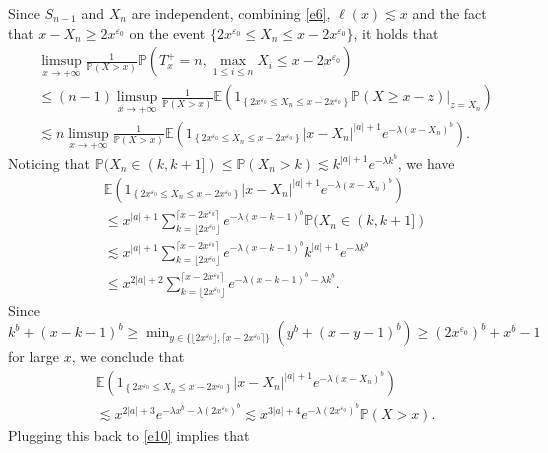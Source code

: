 \documentclass[11pt]{article}
\numberwithin{equation}{section}
\begin{document}
Since $S_{n-1}$ and $X_n$ are independent, combining \eqref{e6}, $\ell (x)\lesssim x$ and the fact that $x-X_n \geq 2x^{\varepsilon_0}$ on the event $\{2x^{\varepsilon_0}\leq X_n \leq x-2x^{\varepsilon_0}\}$,  it holds that 
\begin{align}\label{e10}
	& \limsup_{x\to+\infty} \frac{1}{\mathbb{P}(X>x)}\mathbb{P}\left(T_x^+=n, \max_{1\leq i\leq n} X_i \leq x-2x^{\varepsilon_0}\right)\nonumber\\
	& \leq (n-1) \limsup_{x\to+\infty} \frac{1}{\mathbb{P}(X>x)}\mathbb{E}\left(1_{\left\{2x^{\varepsilon_0}\leq X_n \leq x-2x^{\varepsilon_0} \right\}} \mathbb{P}(X \geq x-z)\big|_{z=X_n} \right) \nonumber\\
	&\lesssim  n \limsup_{x\to+\infty} \frac{1}{\mathbb{P}(X>x)} \mathbb{E}\left(1_{\left\{2x^{\varepsilon_0}\leq X_n \leq x-2x^{\varepsilon_0} \right\}}  |x-X_n|^{|a|+1}e^{-\lambda (x-X_n)^b} \right) .
\end{align}
Noticing that $\mathbb{P}(X_n \in (k, k+1])\leq \mathbb{P}(X_n >k)\lesssim k^{|a|+1}e^{-\lambda k^b}$, we have
\begin{align}
	&\mathbb{E}\left(1_{\left\{2x^{\varepsilon_0}\leq X_n \leq x-2x^{\varepsilon_0} \right\}}  |x-X_n|^{|a|+1}e^{-\lambda (x-X_n)^b} \right) \nonumber\\
	&\leq x^{|a|+1} \sum_{k=\lfloor 2x^{\varepsilon_0}\rfloor}^{\lceil x-2x^{\varepsilon_0}\rceil} e^{-\lambda (x-k-1)^b}\mathbb{P}(X_n\in (k, k+1]) \nonumber\\
	&\lesssim x^{|a|+1} \sum_{k=\lfloor 2x^{\varepsilon_0}\rfloor}^{\lceil x-2x^{\varepsilon_0}\rceil}   e^{-\lambda (x-k-1)^b}k^{|a|+1}e^{-\lambda k^{b}}\nonumber\\
	&\leq x^{2|a|+2} \sum_{k=\lfloor 2x^{\varepsilon_0}\rfloor}^{\lceil x-2x^{\varepsilon_0}\rceil}   e^{-\lambda (x-k-1)^b-\lambda k^{b}}.
\end{align}
Since $k^b + (x-k-1)^b\geq  \min_{y\in \{ \lfloor 2x^{\varepsilon_0}\rfloor,  \lceil x-2x^{\varepsilon_0} \rceil \}}(y^b + (x-y-1)^b) \geq (2x^{\varepsilon_0})^b +x^b-1$ for large $x$, we conclude that 
\begin{align}\label{e10-1}
&\mathbb{E}\left(1_{\left\{2x^{\varepsilon_0}\leq X_n \leq x-2x^{\varepsilon_0} \right\}}  |x-X_n|^{|a|+1}e^{-\lambda (x-X_n)^b} \right) \nonumber\\
&\lesssim x^{2|a|+3} e^{-\lambda x^b-\lambda (2x^{\varepsilon_0})^{b}} \lesssim x^{3|a|+4}e^{-\lambda (2x^{\varepsilon_0})^{b}} \mathbb{P}(X>x).
\end{align}
Plugging this back to \eqref{e10} implies that 
\end{document}
